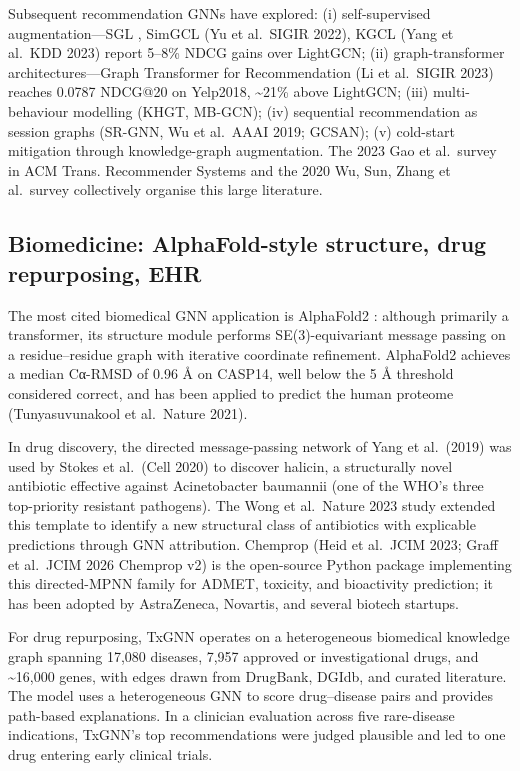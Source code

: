 \documentclass{article}
\begin{document}
Subsequent recommendation GNNs have explored: (i) self-supervised augmentation---SGL \citep{wu2020graphneuralnetwork}, SimGCL (Yu et al.~SIGIR 2022), KGCL (Yang et al.~KDD 2023) report 5--8\% NDCG gains over LightGCN; (ii) graph-transformer architectures---Graph Transformer for Recommendation (Li et al.~SIGIR 2023) reaches 0.0787 NDCG@20 on Yelp2018, \textasciitilde21\% above LightGCN; (iii) multi-behaviour modelling (KHGT, MB-GCN); (iv) sequential recommendation as session graphs (SR-GNN, Wu et al.~AAAI 2019; GCSAN); (v) cold-start mitigation through knowledge-graph augmentation. The 2023 Gao et al.~survey in ACM Trans. Recommender Systems and the 2020 Wu, Sun, Zhang et al.~survey collectively organise this large literature.

\subsection{Biomedicine: AlphaFold-style structure, drug repurposing, EHR}\label{biomedicine-alphafold-style-structure-drug-repurposing-ehr}

The most cited biomedical GNN application is AlphaFold2 \citep{jumper20212021}: although primarily a transformer, its structure module performs SE(3)-equivariant message passing on a residue--residue graph with iterative coordinate refinement. AlphaFold2 achieves a median Cα-RMSD of 0.96 Å on CASP14, well below the 5 Å threshold considered correct, and has been applied to predict the human proteome (Tunyasuvunakool et al.~Nature 2021).

In drug discovery, the directed message-passing network of Yang et al.~(2019) was used by Stokes et al.~(Cell 2020) to discover halicin, a structurally novel antibiotic effective against Acinetobacter baumannii (one of the WHO's three top-priority resistant pathogens). The Wong et al.~Nature 2023 study extended this template to identify a new structural class of antibiotics with explicable predictions through GNN attribution. Chemprop (Heid et al.~JCIM 2023; Graff et al.~JCIM 2026 Chemprop v2) is the open-source Python package implementing this directed-MPNN family for ADMET, toxicity, and bioactivity prediction; it has been adopted by AstraZeneca, Novartis, and several biotech startups.

For drug repurposing, TxGNN \citep{huang20242024} operates on a heterogeneous biomedical knowledge graph spanning 17,080 diseases, 7,957 approved or investigational drugs, and \textasciitilde16,000 genes, with edges drawn from DrugBank, DGIdb, and curated literature. The model uses a heterogeneous GNN to score drug--disease pairs and provides path-based explanations. In a clinician evaluation across five rare-disease indications, TxGNN's top recommendations were judged plausible and led to one drug entering early clinical trials.
\end{document}
